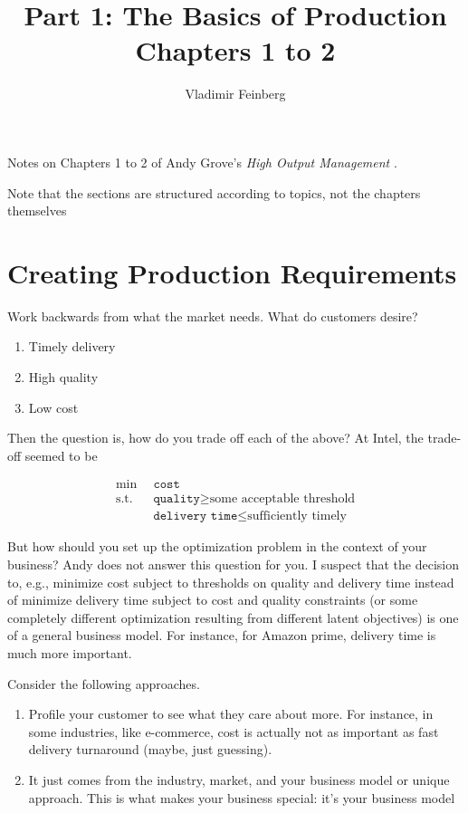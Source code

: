 \documentclass{article}
\title{Part 1: The Basics of Production\\Chapters 1 to 2}
\author{Vladimir Feinberg}
\begin{document}
\maketitle

Notes on Chapters 1 to 2 of Andy Grove's \textit{High Output Management} \cite{highoutput}.

Note that the sections are structured according to topics, not the chapters themselves

\section{Creating Production Requirements}

Work backwards from what the market needs. What do customers desire?

\begin{enumerate}
\item Timely delivery
\item High quality
\item Low cost
\end{enumerate}

Then the question is, how do you trade off each of the above? At Intel, the trade-off seemed to be

\begin{align*} 
  \min \,\,\,& \texttt{cost}\\
  \text{s.t.}\,\,\, & \texttt{quality}\ge \text{some acceptable threshold} \\
 & \texttt{delivery time}\le \text{sufficiently timely}
\end{align*}

But how should you set up the optimization problem in the context of your business? Andy does not answer this question for you. I suspect that the decision to, e.g., minimize cost subject to thresholds on quality and delivery time instead of minimize delivery time subject to cost and quality constraints (or some completely different optimization resulting from different latent objectives) is one of a general business model. For instance, for Amazon prime, delivery time is much more important.

Consider the following approaches.
\begin{enumerate}
\item Profile your customer to see what they care about more. For instance, in some industries, like e-commerce, cost is actually not as important as fast delivery turnaround (maybe, just guessing).
\item It just comes from the industry, market, and your business model or unique approach. This is what makes your business special: it's your business model
\end{enumerate}
\end{document}
